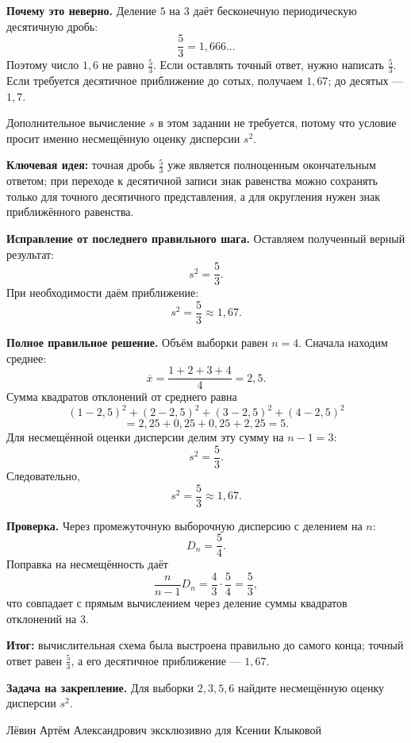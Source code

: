 \documentclass[12pt,a4paper]{article}
\begin{document}
\textbf{Почему это неверно.}
Деление $5$ на $3$ даёт бесконечную периодическую десятичную дробь:
\[
\frac53=1{,}666\ldots
\]
Поэтому число $1{,}6$ не равно $\frac53$. Если оставлять точный ответ, нужно написать $\frac53$. Если требуется десятичное приближение до сотых, получаем $1{,}67$; до десятых --- $1{,}7$.

Дополнительное вычисление $s$ в этом задании не требуется, потому что условие просит именно несмещённую оценку дисперсии $s^2$.

\textcolor{blue!60!black}{\textbf{Ключевая идея:}} точная дробь $\frac53$ уже является полноценным окончательным ответом; при переходе к десятичной записи знак равенства можно сохранять только для точного десятичного представления, а для округления нужен знак приближённого равенства.

\textbf{Исправление от последнего правильного шага.}
Оставляем полученный верный результат:
\[
s^2=\frac53.
\]
При необходимости даём приближение:
\[
s^2=\frac53\approx1{,}67.
\]

\textbf{Полное правильное решение.}
Объём выборки равен $n=4$. Сначала находим среднее:
\[
\overline{x}=\frac{1+2+3+4}{4}=2{,}5.
\]
Сумма квадратов отклонений от среднего равна
\[
(1-2{,}5)^2+(2-2{,}5)^2+(3-2{,}5)^2+(4-2{,}5)^2
\]
\[
=2{,}25+0{,}25+0{,}25+2{,}25=5.
\]
Для несмещённой оценки дисперсии делим эту сумму на $n-1=3$:
\[
s^2=\frac{5}{3}.
\]
Следовательно,
\[
s^2=\frac53\approx1{,}67.
\]

\textbf{Проверка.}
Через промежуточную выборочную дисперсию с делением на $n$:
\[
D_n=\frac54.
\]
Поправка на несмещённость даёт
\[
\frac{n}{n-1}D_n=\frac43\cdot\frac54=\frac53,
\]
что совпадает с прямым вычислением через деление суммы квадратов отклонений на $3$.

\textcolor{teal!60!black}{\textbf{Итог:}} вычислительная схема была выстроена правильно до самого конца; точный ответ равен $\frac53$, а его десятичное приближение --- $1{,}67$.

\textbf{Задача на закрепление.}
Для выборки $2,3,5,6$ найдите несмещённую оценку дисперсии $s^2$.

\vfill
\begin{center}
\small Лёвин Артём Александрович эксклюзивно для Ксении Клыковой
\end{center}
\end{document}
